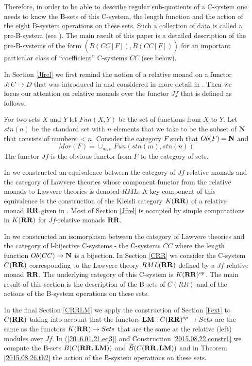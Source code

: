 \documentclass[12pt]{amsart}
\newcommand{\sr}{\rightarrow}
\newcommand{\nn}{{\bf N\rm}}
\newcommand{\nat}{\nn}
\newcommand{\wt}{\widetilde}
\newcommand{\RR}{{\bf RR}}
\newcommand{\LM}{{\bf LM}}
\begin{document}
Therefore, in order to be able to describe regular sub-quotients of a C-system one needs to know the B-sets of this C-system, the length function and the action of 
the eight B-system operations on these sets. Such a collection of data is called a pre-B-system (see \cite{Bsystems}). The main result of this paper is a detailed description of the pre-B-systems of the form $(B(CC[F]),\wt{B}(CC[F]))$ for an important particular class of ``coefficient'' C-systems $CC$ (see below). 

In Section \ref{Jfrel} we first remind the notion of a relative monad on a functor $J:C\sr D$ that was introduced in \cite[Def.1, p.299]{ACU} and considered in more detail in \cite{ACU2}. Then we focus our attention on relative monads over the functor $Jf$ that is defined as follows. 

For two sets $X$ and $Y$ let $Fun(X,Y)$ be the set of functions from $X$ to $Y$.  Let $stn(n)$ be the standard set with $n$ elements that we take to be the subset of $\nat$ that consists of numbers $<n$. Consider the category $F$ such that $Ob(F)=\nn$ and
%
$$Mor(F)=\cup_{m,n}Fun(stn(m),stn(n))$$
%
The functor $Jf$ is the obvious functor from $F$ to the category of sets. 

In \cite{LandJf} we constructed an equivalence between the category of $Jf$-relative monads and the category of Lawvere theories whose component functor from the relative monads to Lawvere theories is denoted $RML$. A key component of this equivalence is the construction of the Kleisli category $K(\RR)$ of a relative monad $\RR$ given in \cite{ACU2}.  Most of Section \ref{Jfrel} is occupied by simple computations in $K(\RR)$ for $Jf$-relative monads $\RR$.

In \cite{LandC} we constructed an isomorphism between the category of Lawvere theories and the category of l-bijective C-systems - the C-systems $CC$ where the length function $Ob(CC)\sr \nat$ is a bijection. In Section \ref{CRR} we consider the C-system $C(\RR)$ corresponding to the Lawvere theory $RML(\RR)$ defined by a $Jf$-relative monad $\RR$. The underlying category of this C-system is $K(\RR)^{op}$. The main result of this section is the description of the B-sets of $C(RR)$ and of the actions of the B-system operations on these sets.

In the final Section \ref{CRRLM} we apply the construction of Section \ref{Fext} to $C(\RR)$ taking into account that the functors $\LM:C(\RR)^{op}\sr Sets$ are the same as the functors $K(\RR)\sr Sets$ that are the same as the relative (left) modules over $Jf$. In (\ref{2016.01.21.eq3}) and Construction \ref{2015.08.22.constr1} we compute the B-sets $B(C(\RR,\LM))$ and $\wt{B}(C(\RR,\LM))$ and in Theorem \ref{2015.08.26.th2} the action of the B-system operations on these sets. 
\end{document}
